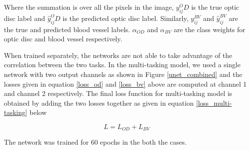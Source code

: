 Where the summation is over all the pixels in the image, $y_{ij}^OD$ is the true optic disc label and  $\hat{y}_{ij}^OD$ is the predicted optic disc label.
Similarly, $y_{ij}^{BV}$ and $\hat{y}_{ij}^{BV}$ are the true and predicted blood vessel labels.
$\alpha_{OD}$ and $\alpha_{BV}$ are the class weights for optic disc and blood vessel respectively.

When trained separately, the networks are not able to take advantage of the correlation between the two tasks.
In the multi-tasking model, we used a single network with two output channels as shown in Figure \ref{unet_combined} and the losses given in equation \ref{loss_od} and \ref{loss_bv} above are computed at channel 1 and channel 2 respectively.
The final loss function for multi-tasking model is obtained by adding the two losses together as given in equation \ref{loss_multi-tasking} below

\begin{equation}\label{loss_multi-tasking}
  L = L_{OD} + L_{BV}
\end{equation}

The network was trained for 60 epochs in the both the cases.

